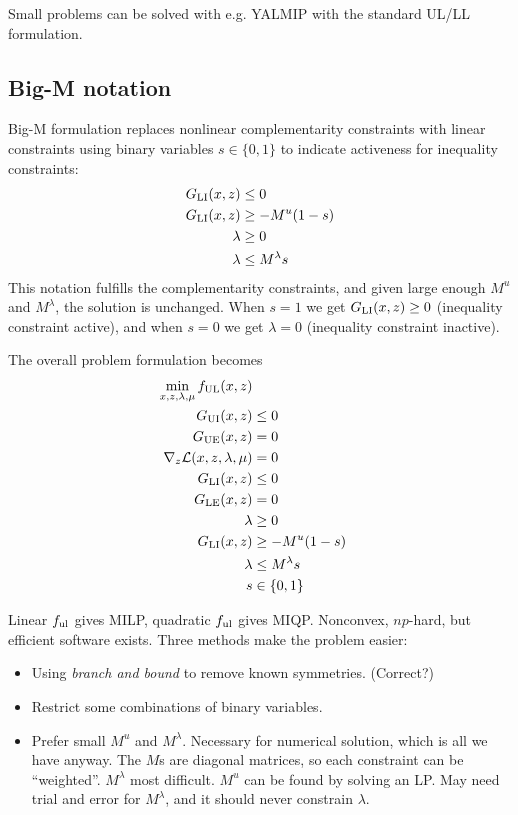 Small problems can be solved with e.g. YALMIP with the standard UL/LL formulation.

\subsection{Big-M notation}
Big-M formulation replaces nonlinear complementarity constraints with linear constraints using binary variables $s \in \{0,1\}$ to indicate activeness for inequality constraints:
\begin{equation}\label{eq:big-M}
\begin{split}
    G_\mathrm{LI}(x,z) &\leq 0 \\
    G_\mathrm{LI}(x,z) &\geq -M^u(1-s) \\
    \lambda        &\geq 0 \\
    \lambda        &\leq M^\lambda s
\end{split}
\end{equation}
This notation fulfills the complementarity constraints, and given large enough $M^u$ and $M^\lambda$, the solution is unchanged. When $s = 1$ we get $G_\mathrm{LI}(x,z) \geq 0$ (inequality constraint active), and when $s = 0$ we get $\lambda = 0$ (inequality constraint inactive).

The overall problem formulation becomes
\begin{equation}
\begin{split}
    \min_{x,z,\lambda,\mu} f_\mathrm{UL}(x,z) \\
    G_\mathrm{UI}(x,z) & \leq 0 \\
    G_\mathrm{UE}(x,z) &= 0 \\
    \nabla_z \mathcal{L}(x,z,\lambda,\mu) &= 0 \\
    G_\mathrm{LI}(x,z) &\leq 0 \\
    G_\mathrm{LE}(x,z) &= 0 \\
    \lambda &\geq 0 \\
    G_\mathrm{LI}(x,z) &\geq -M^u(1-s) \\
    \lambda &\leq M^\lambda s \\
    s &\in \{0,1\}
\end{split}
\end{equation}

Linear $f_\mathrm{ul}$ gives MILP, quadratic $f_\mathrm{ul}$ gives MIQP. Nonconvex, $np$-hard, but efficient software exists. Three methods make the problem easier:
\begin{itemize}
    \item Using \emph{branch and bound} to remove known symmetries. (Correct?)
    \item Restrict some combinations of binary variables.
    \item Prefer small $M^u$ and $M^\lambda$. Necessary for numerical solution, which is all we have anyway. The $M$s are diagonal matrices, so each constraint can be ``weighted''. $M^\lambda$ most difficult. $M^u$ can be found by solving an LP. May need trial and error for $M^\lambda$, and it should never constrain $\lambda$.
\end{itemize}
